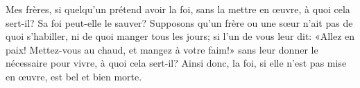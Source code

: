 Mes frères, si quelqu’un prétend avoir la foi, sans la mettre en œuvre,
	à quoi cela sert-il?
	Sa foi peut-elle le sauver?
Supposons qu’un frère ou une sœur n’ait pas de quoi s’habiller,
	ni de quoi manger tous les jours;
	si l’un de vous leur dit:
	«Allez en paix! Mettez-vous au chaud, et mangez à votre faim!»
	sans leur donner le nécessaire pour vivre,
	à quoi cela sert-il?
Ainsi donc, la foi, si elle n’est pas mise en œuvre, est bel et bien morte.
